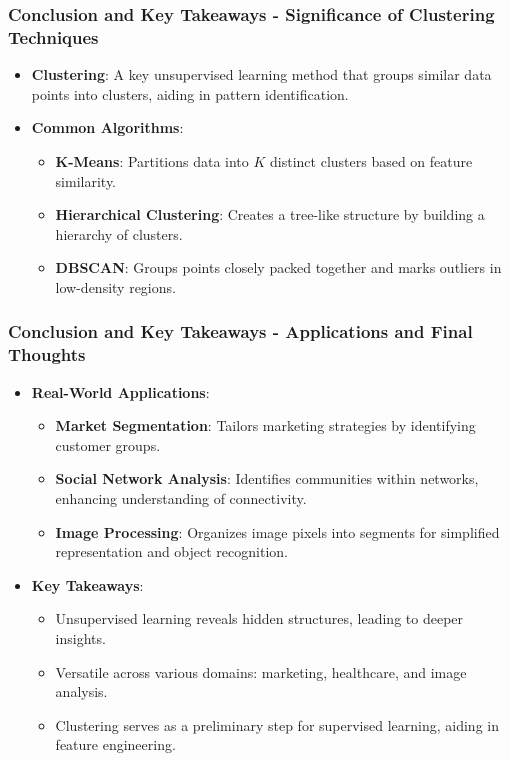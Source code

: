\documentclass{beamer}
\begin{document}
\begin{frame}[fragile]
    \frametitle{Conclusion and Key Takeaways - Significance of Clustering Techniques}
    \begin{itemize}
        \item \textbf{Clustering}: A key unsupervised learning method that groups similar data points into clusters, aiding in pattern identification.
        \item \textbf{Common Algorithms}:
            \begin{itemize}
                \item \textbf{K-Means}: Partitions data into $K$ distinct clusters based on feature similarity.
                \item \textbf{Hierarchical Clustering}: Creates a tree-like structure by building a hierarchy of clusters.
                \item \textbf{DBSCAN}: Groups points closely packed together and marks outliers in low-density regions.
            \end{itemize}
    \end{itemize}
\end{frame}

\begin{frame}[fragile]
    \frametitle{Conclusion and Key Takeaways - Applications and Final Thoughts}
    \begin{itemize}
        \item \textbf{Real-World Applications}:
            \begin{itemize}
                \item \textbf{Market Segmentation}: Tailors marketing strategies by identifying customer groups.
                \item \textbf{Social Network Analysis}: Identifies communities within networks, enhancing understanding of connectivity.
                \item \textbf{Image Processing}: Organizes image pixels into segments for simplified representation and object recognition.
            \end{itemize}
        \item \textbf{Key Takeaways}:
            \begin{itemize}
                \item Unsupervised learning reveals hidden structures, leading to deeper insights.
                \item Versatile across various domains: marketing, healthcare, and image analysis.
                \item Clustering serves as a preliminary step for supervised learning, aiding in feature engineering.
            \end{itemize}
    \end{itemize}
\end{frame}
\end{document}
